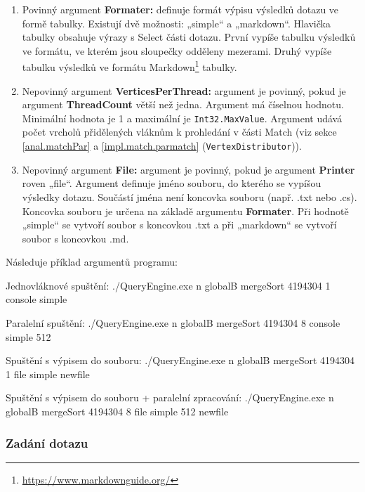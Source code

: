 \begin{enumerate}
\item Povinný argument \textbf{Formater:} definuje formát výpisu výsledků dotazu ve formě tabulky.
Existují dvě možnosti: „simple“ a „markdown“.
Hlavička tabulky obsahuje výrazy s Select části dotazu.
První vypíše tabulku výsledků ve formátu, ve kterém jsou sloupečky odděleny mezerami.
Druhý vypíše tabulku výsledků ve formátu Markdown\footnote{\url{https://www.markdownguide.org/}} tabulky.

\item Nepovinný argument \textbf{VerticesPerThread:} argument je povinný, pokud je argument \textbf{ThreadCount} větší než jedna.
Argument má číselnou hodnotu.
Minimální hodnota je 1 a maximální je \texttt{Int32.MaxValue}.
Argument udává počet vrcholů přidělených vláknům k prohledání v části Match (viz sekce \ref{anal.matchPar} a \ref{impl.match.parmatch} (\texttt{VertexDistributor})).

\item Nepovinný argument \textbf{File:} argument je povinný, pokud je argument \textbf{Printer} roven „file“.
Argument definuje jméno souboru, do kterého se vypíšou výsledky dotazu.
Součástí jména není koncovka souboru (např. .txt nebo .cs).
Koncovka souboru je určena na základě argumentu \textbf{Formater}.
Při hodnotě „simple“ se vytvoří soubor s koncovkou .txt a při „markdown“ se vytvoří soubor s koncovkou .md. 
\end{enumerate}

Následuje příklad argumentů programu:
\begin{code}
Jednovláknové spuštění:
./QueryEngine.exe n globalB mergeSort 4194304 1 console simple

Paralelní spuštění:
./QueryEngine.exe n globalB mergeSort 4194304 8 console simple 512

Spuštění s výpisem do souboru:  
./QueryEngine.exe n globalB mergeSort 4194304 1 file simple newfile

Spuštění s výpisem do souboru + paralelní zpracování:
./QueryEngine.exe n globalB mergeSort 4194304 8 file simple 512 newfile
\end{code}

\subsubsection{Zadání dotazu}

